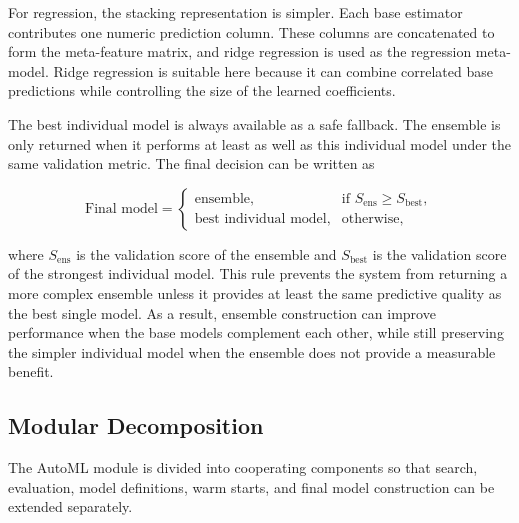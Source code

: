 \documentclass[12pt,a4paper]{report}
\begin{document}
\noindent For regression, the stacking representation is simpler. Each base estimator
contributes one numeric prediction column. These columns are concatenated to
form the meta-feature matrix, and ridge regression is used as the regression
meta-model. Ridge regression is suitable here because it can combine correlated
base predictions while controlling the size of the learned coefficients.

\noindent The best individual model is always available as a safe fallback. The ensemble
is only returned when it performs at least as well as this individual model under
the same validation metric. The final decision can be written as

\[
\text{Final model} =
\begin{cases}
\text{ensemble}, & \text{if } S_{\text{ens}} \geq S_{\text{best}}, \\
\text{best individual model}, & \text{otherwise},
\end{cases}
\]

\noindent where \(S_{\text{ens}}\) is the validation score of the ensemble and
\(S_{\text{best}}\) is the validation score of the strongest individual model.
This rule prevents the system from returning a more complex ensemble unless it
provides at least the same predictive quality as the best single model. As a
result, ensemble construction can improve performance when the base models
complement each other, while still preserving the simpler individual model when
the ensemble does not provide a measurable benefit.

\subsection{Modular Decomposition}
\noindent The AutoML module is divided into cooperating components so that search,
evaluation, model definitions, warm starts, and final model construction can be
extended separately.
\end{document}
